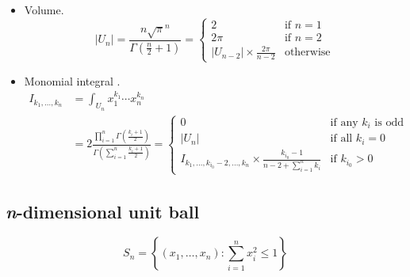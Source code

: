\documentclass[draft]{scrartcl}
\begin{document}
\begin{itemize}
  \item Volume.
\begin{equation}\label{ndimsphere}
  |U_n|
  = \frac{n \sqrt{\pi}^n}{\Gamma(\frac{n}{2}+1)}
  = \begin{cases}
    2&\text{if $n = 1$}\\
    2\pi&\text{if $n = 2$}\\
    |U_{n-2}| \times \frac{2\pi}{n - 2}&\text{otherwise}
  \end{cases}
\end{equation}

  \item Monomial integral \cite{folland}.
\begin{align}\nonumber
  I_{k_1,\dots,k_n}
  &= \int_{U_n} x_1^{k_1}\cdots x_n^{k_n}\\
  &= 2 \frac{\prod_{i=1}^n
    \Gamma\left(\frac{k_i+1}{2}\right)}{\Gamma\left(\sum_{i=1}^n\frac{k_i+1}{2}\right)}
  =\begin{cases}
    0&\text{if any $k_i$ is odd}\\
    |U_n|&\text{if all $k_i=0$}\\
    I_{k_1,\dots,k_{i_0}-2,\dots,k_n} \times \frac{k_{i_0} - 1}{n - 2 + \sum_{i=1}^n k_i}&\text{if $k_{i_0} > 0$}
  \end{cases}
\end{align}
\end{itemize}


\subsection*{\textit{n}-dimensional unit ball}
\[
  S_n = \left\{(x_1,\dots,x_n): \sum_{i=1}^n x_i^2 \le 1\right\}
\]
\end{document}
